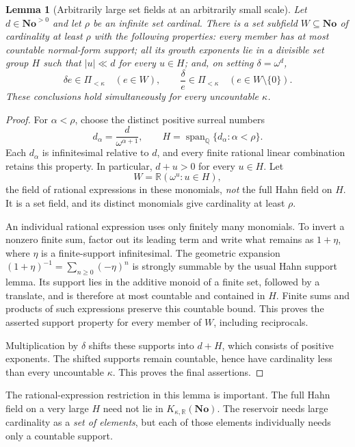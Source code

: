 \documentclass[11pt,letterpaper]{article}
\numberwithin{equation}{section}
\newtheorem{lemma}[theorem]{Lemma}
\theoremstyle{definition}
\theoremstyle{remark}
\newcommand{\R}{\mathbb R}
\newcommand{\Q}{\mathbb Q}
\newcommand{\No}{\mathbf{No}}
\newcommand{\Span}{\operatorname{span}_{\Q}}
\newcommand{\KN}[2]{K_{#1,#2}(\No)}%
\newcommand{\Pk}{\Pi_{<\kappa}}
\begin{document}
\begin{lemma}[Arbitrarily large set fields at an arbitrarily small scale]
\label{fkc:sb:lem:reservoir}
Let $d\in\No^{>0}$ and let $\rho$ be an infinite set cardinal. There is a set subfield $W\subseteq\No$ of cardinality at least $\rho$ with the following properties: every member has at most countable normal-form support; all its growth exponents lie in a divisible set group $H$ such that $|u|\ll d$ for every $u\in H$; and, on setting $\delta=\omega^d$,
\[
 \delta e\in\Pk\quad(e\in W),\qquad
 \frac{\delta}{e}\in\Pk\quad(e\in W\setminus\{0\}).
\]
These conclusions hold simultaneously for every uncountable $\kappa$.
\end{lemma}
\begin{proof}
For $\alpha<\rho$, choose the distinct positive surreal numbers
\[
 d_\alpha=\frac{d}{\omega^{\alpha+1}},\qquad
 H=\Span\{d_\alpha:\alpha<\rho\}.
\]
Each $d_\alpha$ is infinitesimal relative to $d$, and every finite rational linear combination retains this property. In particular, $d+u>0$ for every $u\in H$. Let
\[
 W=\R(\omega^u:u\in H),
\]
the field of rational expressions in these monomials, \emph{not} the full Hahn field on $H$. It is a set field, and its distinct monomials give cardinality at least $\rho$.

An individual rational expression uses only finitely many monomials. To invert a nonzero finite sum, factor out its leading term and write what remains as $1+\eta$, where $\eta$ is a finite-support infinitesimal. The geometric expansion $(1+\eta)^{-1}=\sum_{n\ge0}(-\eta)^n$ is strongly summable by the usual Hahn support lemma. Its support lies in the additive monoid of a finite set, followed by a translate, and is therefore at most countable and contained in $H$. Finite sums and products of such expressions preserve this countable bound. This proves the asserted support property for every member of $W$, including reciprocals.

Multiplication by $\delta$ shifts these supports into $d+H$, which consists of positive exponents. The shifted supports remain countable, hence have cardinality less than every uncountable $\kappa$. This proves the final assertions.
\end{proof}

The rational-expression restriction in this lemma is important. The full Hahn field on a very large $H$ need not lie in $\KN\kappa\R$. The reservoir needs large cardinality as a \emph{set of elements}, but each of those elements individually needs only a countable support.
\end{document}
